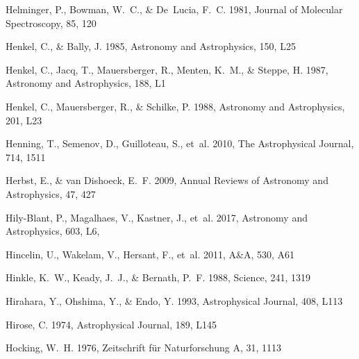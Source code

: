 \documentclass[twocolumn]{aastex631}
\begin{document}
\begin{thebibliography}{}
Helminger, P., Bowman, W.~C., \& De~Lucia, F.~C. 1981, Journal of Molecular
  Spectroscopy, 85, 120

{Henkel}, C., \& {Bally}, J. 1985, Astronomy and Astrophysics, 150, L25

{Henkel}, C., {Jacq}, T., {Mauersberger}, R., {Menten}, K.~M., \& {Steppe}, H.
  1987, Astronomy and Astrophysics, 188, L1

{Henkel}, C., {Mauersberger}, R., \& {Schilke}, P. 1988, Astronomy and
  Astrophysics, 201, L23

Henning, T., Semenov, D., Guilloteau, S., {et~al.} 2010, The Astrophysical
  Journal, 714, 1511

Herbst, E., \& van Dishoeck, E.~F. 2009, Annual Reviews of Astronomy and
  Astrophysics, 47, 427

{Hily-Blant}, P., {Magalhaes}, V., {Kastner}, J., {et~al.} 2017, Astronomy and
  Astrophysics, 603, L6, 

Hincelin, U., Wakelam, V., Hersant, F., {et~al.} 2011, A{\&}A, 530, A61

Hinkle, K.~W., Keady, J.~J., \& Bernath, P.~F. 1988, Science, 241, 1319

Hirahara, Y., Ohshima, Y., \& Endo, Y. 1993, Astrophysical Journal, 408, L113

Hirose, C. 1974, Astrophysical Journal, 189, L145

Hocking, W.~H. 1976, Zeitschrift f{\"u}r Naturforschung A, 31, 1113


\end{thebibliography}
\end{document}
